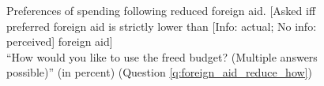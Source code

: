 \begin{figure}[h!]
    \caption[Preferences of spending following reduced foreign aid]{Preferences of spending following reduced foreign aid. [Asked iff preferred foreign aid is strictly lower than [Info: actual; No info: perceived] foreign aid] \\ ``How would you like to use the freed budget? (Multiple answers possible)'' (in percent) (Question \ref{q:foreign_aid_reduce_how})}\label{fig:foreign_aid_reduce_how}
\end{figure}




